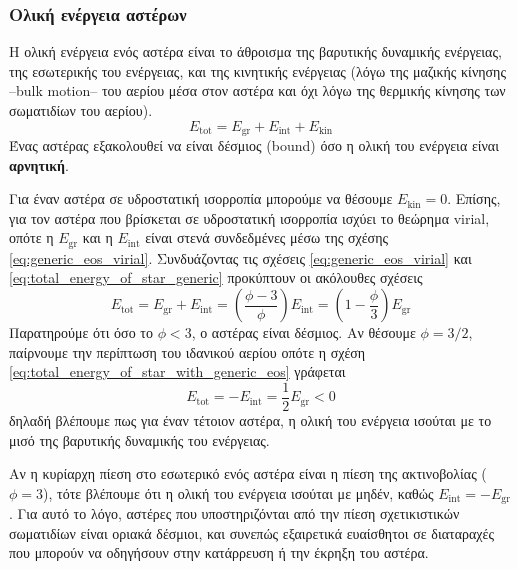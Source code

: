 \subsubsection{Ολική ενέργεια αστέρων}
Η ολική ενέργεια ενός αστέρα είναι το άθροισμα της βαρυτικής δυναμικής ενέργειας, της εσωτερικής του ενέργειας, και της κινητικής ενέργειας (λόγω της μαζικής κίνησης --bulk motion-- του αερίου μέσα στον αστέρα και όχι λόγω της θερμικής κίνησης των σωματιδίων του αερίου).
\begin{equation}
    \label{eq:total_energy_of_star_generic}
    E_{\text{tot}} =  E_{\text{gr}} +  E_{\text{int}} +  E_{\text{kin}}
\end{equation}
Ένας αστέρας εξακολουθεί να είναι δέσμιος (bound) όσο η ολική του ενέργεια είναι \textbf{αρνητική}.

Για έναν αστέρα σε υδροστατική ισορροπία μπορούμε να θέσουμε $ E_{\text{kin}} = 0$. Επίσης, για τον αστέρα που βρίσκεται σε υδροστατική ισορροπία ισχύει το θεώρημα virial, οπότε η $E_{\text{gr}}$ και η $E_{\text{int}}$ είναι στενά συνδεδμένες μέσω της σχέσης \eqref{eq:generic_eos_virial}. Συνδυάζοντας τις σχέσεις \eqref{eq:generic_eos_virial} και \eqref{eq:total_energy_of_star_generic} προκύπτουν οι ακόλουθες σχέσεις
\begin{equation}
    \label{eq:total_energy_of_star_with_generic_eos}
    E_{\text{tot}} = E_{\text{gr}} + E_{\text{int}} = \left( \frac{\phi - 3}{\phi} \right) E_{\text{int}} = \left( 1 - \frac{\phi}{3} \right) E_{\text{gr}}
\end{equation}
Παρατηρούμε ότι όσο το $\phi < 3$, ο αστέρας είναι δέσμιος. Αν θέσουμε $\phi = 3/2$, παίρνουμε την περίπτωση του ιδανικού αερίου οπότε η σχέση \eqref{eq:total_energy_of_star_with_generic_eos} γράφεται
\begin{equation}
    \label{eq:total_energy_of_star_ideal_gas}
     \boxed{E_{\text{tot}} = -  E_{\text{int}} = \frac{1}{2}  E_{\text{gr}} < 0}
\end{equation}
δηλαδή βλέπουμε πως για έναν τέτοιον αστέρα, η ολική του ενέργεια ισούται με το μισό της βαρυτικής δυναμικής του ενέργειας. 

Αν η κυρίαρχη πίεση στο εσωτερικό ενός αστέρα είναι η πίεση της ακτινοβολίας ($\phi = 3$), τότε βλέπουμε ότι η ολική του ενέργεια ισούται με μηδέν, καθώς $ E_{\text{int}} = -  E_{\text{gr}}$. Για αυτό το λόγο, αστέρες που υποστηριζόνται από την πίεση σχετικιστικών σωματιδίων είναι οριακά δέσμιοι, και συνεπώς εξαιρετικά ευαίσθητοι σε διαταραχές που μπορούν να οδηγήσουν στην κατάρρευση ή την έκρηξη του αστέρα. 


